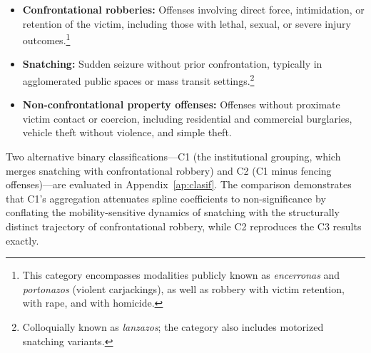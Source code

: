 \documentclass[pdflatex,sn-basic]{sn-jnl}
\begin{document}
\begin{itemize}
  \item \textbf{Confrontational robberies:} Offenses involving direct force, intimidation, or retention of the victim, including those with lethal, sexual, or severe injury outcomes.\footnote{This category encompasses modalities publicly known as \textit{encerronas} and \textit{portonazos} (violent carjackings), as well as robbery with victim retention, with rape, and with homicide.}
  \item \textbf{Snatching:} Sudden seizure without prior confrontation, typically in agglomerated public spaces or mass transit settings.\footnote{Colloquially known as \textit{lanzazos}; the category also includes motorized snatching variants.}
  \item \textbf{Non-confrontational property offenses:} Offenses without proximate victim contact or coercion, including residential and commercial burglaries, vehicle theft without violence, and simple theft.
\end{itemize}

Two alternative binary classifications---C1 (the institutional grouping, which merges snatching with confrontational robbery) and C2 (C1 minus fencing offenses)---are evaluated in Appendix~\ref{ap:clasif}. The comparison demonstrates that C1's aggregation attenuates spline coefficients to non-significance by conflating the mobility-sensitive dynamics of snatching with the structurally distinct trajectory of confrontational robbery, while C2 reproduces the C3 results exactly.
\end{document}

